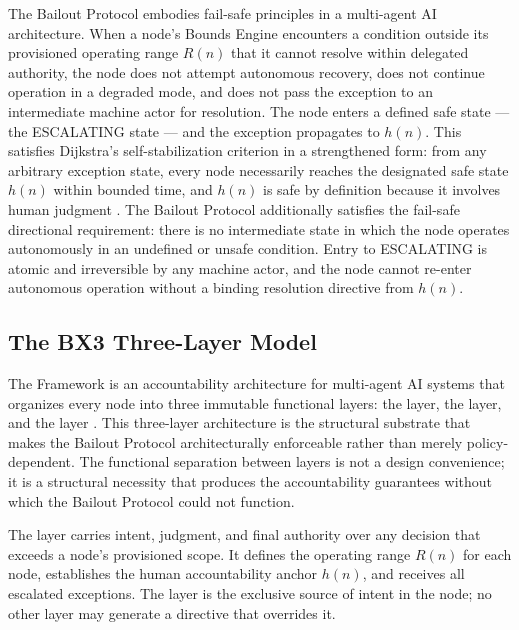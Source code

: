 The Bailout Protocol embodies fail-safe principles in a multi-agent AI architecture. When a node's Bounds Engine encounters a condition outside its provisioned operating range $R(n)$ that it cannot resolve within delegated authority, the node does not attempt autonomous recovery, does not continue operation in a degraded mode, and does not pass the exception to an intermediate machine actor for resolution. The node enters a defined safe state --- the ESCALATING state --- and the exception propagates to $h(n)$. This satisfies Dijkstra's self-stabilization criterion in a strengthened form: from any arbitrary exception state, every node necessarily reaches the designated safe state $h(n)$ within bounded time, and $h(n)$ is safe by definition because it involves human judgment \cite{dijkstra1982}. The Bailout Protocol additionally satisfies the fail-safe directional requirement: there is no intermediate state in which the node operates autonomously in an undefined or unsafe condition. Entry to ESCALATING is atomic and irreversible by any machine actor, and the node cannot re-enter autonomous operation without a binding resolution directive from $h(n)$.

\subsection{The BX3 Three-Layer Model}\label{sec:three-layer}

The \bxthree{} Framework is an accountability architecture for multi-agent AI systems that organizes every node into three immutable functional layers: the \purpose{} layer, the \bounds{} layer, and the \fact{} layer \cite{bx3framework}. This three-layer architecture is the structural substrate that makes the Bailout Protocol architecturally enforceable rather than merely policy-dependent. The functional separation between layers is not a design convenience; it is a structural necessity that produces the accountability guarantees without which the Bailout Protocol could not function.

The \purpose{} layer carries intent, judgment, and final authority over any decision that exceeds a node's provisioned scope. It defines the operating range $R(n)$ for each node, establishes the human accountability anchor $h(n)$, and receives all escalated exceptions. The \purpose{} layer is the exclusive source of intent in the node; no other layer may generate a directive that overrides it.

